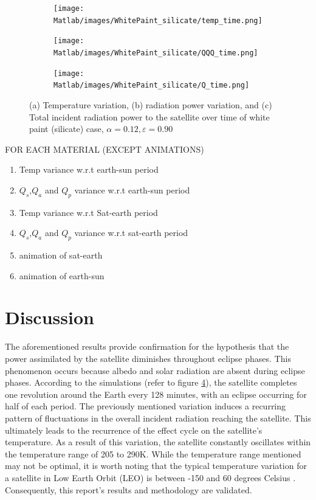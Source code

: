 \documentclass[11pt]{article}
\begin{document}
\begin{figure}[H]
    \centering
    \begin{subfigure}[b]{1\textwidth}
        \texttt{[image: Matlab/images/WhitePaint\_silicate/temp\_time.png]}
        \caption{}
        \label{fig:temptime}
    \end{subfigure}
    \begin{subfigure}[b]{1\textwidth}
        \texttt{[image: Matlab/images/WhitePaint\_silicate/QQQ\_time.png]}
        \caption{}
        \label{fig:temptime}
    \end{subfigure}
    \begin{subfigure}[b]{1\textwidth}
        \texttt{[image: Matlab/images/WhitePaint\_silicate/Q\_time.png]}
        \caption{}
        \label{fig:temptime}
    \end{subfigure}
    \caption{(a) Temperature variation, (b) radiation power variation, and (c) Total incident radiation power to the satellite over time of white paint (silicate) case, $\alpha=0.12, \varepsilon = 0.90$}
\end{figure}







 
FOR EACH MATERIAL (EXCEPT ANIMATIONS)
\begin{enumerate}
    \item Temp variance w.r.t earth-sun period
    \item $Q_{s}$,$Q_{a}$ and $Q_{p}$ variance w.r.t earth-sun period
    \item Temp variance w.r.t Sat-earth period
    \item $Q_{s}$,$Q_{a}$ and $Q_{p}$ variance w.r.t sat-earth period
    \item animation of sat-earth
    \item animation of earth-sun 


\end{enumerate}


\newpage
\section{Discussion} %
\indent The aforementioned results provide confirmation for the hypothesis that the power assimilated by the satellite diminishes throughout eclipse phases. This phenomenon occurs because albedo and solar radiation are absent during eclipse phases. According to the simulations (refer to figure \ref{fig:temptime}), the satellite completes one revolution around the Earth every 128 minutes, with an eclipse occurring for half of each period. The previously mentioned variation induces a recurring pattern of fluctuations in the overall incident radiation reaching the satellite. This ultimately leads to the recurrence of the effect cycle on the satellite's temperature. As a result of this variation, the satellite constantly oscillates within the temperature range of 205 to 290K. While the temperature range mentioned may not be optimal, it is worth noting that the typical temperature variation for a satellite in Low Earth Orbit (LEO) is between -150 and 60 degrees Celsius \cite{iles2004photovoltaic}. Consequently, this report's results and methodology are validated.
\end{document}
